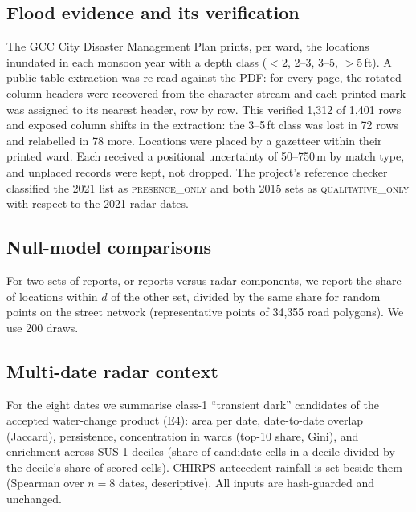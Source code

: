 \documentclass[conference]{IEEEtran}
\begin{document}
\subsection{Flood evidence and its verification}
The GCC City Disaster Management Plan prints, per ward, the locations inundated in each monsoon year with a depth class (${<}2$, 2--3, 3--5, ${>}5$\,ft). A public table extraction was re-read against the PDF: for every page, the rotated column headers were recovered from the character stream and each printed mark was assigned to its nearest header, row by row. This verified 1{,}312 of 1{,}401 rows and exposed column shifts in the extraction: the 3--5\,ft class was lost in 72 rows and relabelled in 78 more. Locations were placed by a gazetteer within their printed ward. Each received a positional uncertainty of 50--750\,m by match type, and unplaced records were kept, not dropped. The project's reference checker classified the 2021 list as \textsc{presence\_only} and both 2015 sets as \textsc{qualitative\_only} with respect to the 2021 radar dates.

\subsection{Null-model comparisons}
For two sets of reports, or reports versus radar components, we report the share of locations within $d$ of the other set, divided by the same share for random points on the street network (representative points of 34{,}355 road polygons). We use 200 draws.

\subsection{Multi-date radar context}
For the eight dates we summarise class-1 ``transient dark'' candidates of the accepted water-change product (E4): area per date, date-to-date overlap (Jaccard), persistence, concentration in wards (top-10 share, Gini), and enrichment across SUS-1 deciles (share of candidate cells in a decile divided by the decile's share of scored cells). CHIRPS antecedent rainfall is set beside them (Spearman over $n=8$ dates, descriptive). All inputs are hash-guarded and unchanged.
\end{document}
